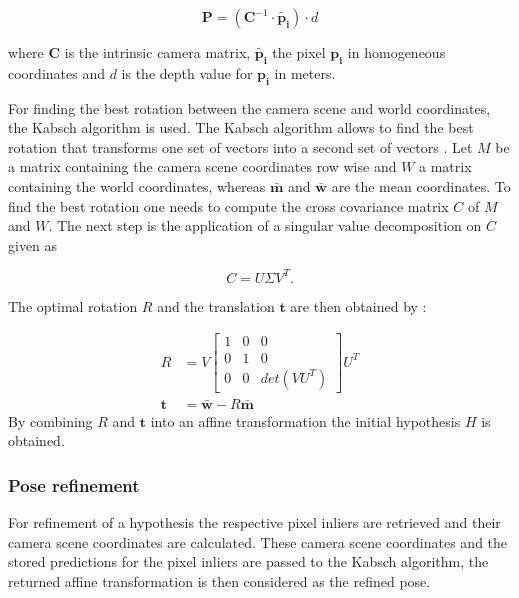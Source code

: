 \documentclass[final]{cvpr}
\begin{document}
\begin{equation}
	\boldsymbol{P} = (\boldsymbol{C}^{-1} \cdot \boldsymbol{\tilde{p_{i}}} ) \cdot d
\end{equation}

where $\boldsymbol{C}$ is the intrinsic camera matrix, $\boldsymbol{\tilde{p_{i}}}$ the pixel $\boldsymbol{p_{i}}$ in
homogeneous coordinates and $d$ is the depth value for $\boldsymbol{p_{i}}$ in meters. 

For finding the best
rotation between the camera scene and world coordinates, the Kabsch algorithm is used. The Kabsch algorithm 
allows to find the best rotation that transforms one set of vectors into a second set of vectors \cite{Kabsch1976}.
Let $M$ be a matrix containing the camera scene coordinates row wise and $W$ a matrix containing
the world coordinates, whereas $\boldsymbol{\bar{m}}$ and $\boldsymbol{\bar{w}}$ are the mean coordinates.
To find the best rotation one needs to compute the cross covariance matrix $C$ of $M$ and $W$. The 
next step is the application of a singular value decomposition on $C$ given as~\cite{Brachmann2020}

\begin{equation}
	C = U \Sigma V^T.
\end{equation}

The optimal rotation $R$ and the translation $\boldsymbol{t}$ are then obtained by \cite{Brachmann2020}:

\begin{equation}
	\begin{split}
		R &= V 
		\begin{bmatrix}
			1 & 0 & 0\\
			0 & 1 & 0\\
			0 & 0 & det(VU^T)
		\end{bmatrix}
		U^T \\
		\boldsymbol{t} &= \boldsymbol{\bar{w}} - R \boldsymbol{\bar{m}}
	\end{split}
\end{equation}
 By combining $R$ and $\boldsymbol{t}$ into an affine transformation the initial hypothesis $H$ is obtained.
 
\subsubsection{Pose refinement}
For refinement of a hypothesis the respective pixel inliers are retrieved and their camera scene 
coordinates are calculated. These camera scene coordinates and the stored predictions for the pixel inliers 
are passed to the Kabsch algorithm, the returned affine transformation is then considered as the refined pose.
\end{document}
